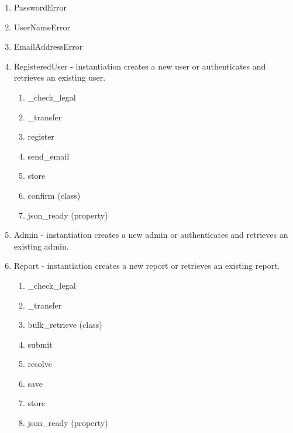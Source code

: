 \documentclass[12pt,letterpaper]{article}
\begin{document}
\begin{enumerate}
\item[] PasswordError
\item[] UserNameError
\item[] EmailAddressError
\item[] RegisteredUser - instantiation creates a new user or authenticates and retrieves an existing user. 
\begin{enumerate}
\item[] \_check\_legal
\item[] \_transfer
\item[] register
\item[] send\_email
\item[] store
\item[] confirm (class)
\item[] json\_ready (property)
\end{enumerate}
\item[] Admin - instantiation creates a new admin or authenticates and retrieves an existing admin. 
\item[] Report - instantiation creates a new report or retrieves an existing report.
\begin{enumerate}
\item[] \_check\_legal
\item[] \_transfer
\item[] bulk\_retrieve (class)
\item[] submit
\item[] resolve
\item[] save
\item[] store
\item[] json\_ready (property)
\end{enumerate}
\end{enumerate}
\end{document}
